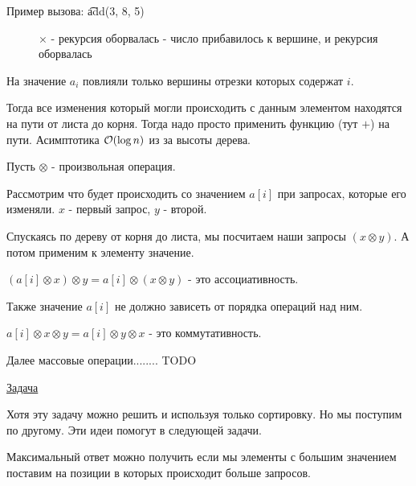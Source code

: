 Пример вызова: \t{add(3, 8, 5)}
\up \up
\begin{center}
	\begin{figure}[h]
		\captionsetup{font=small, labelformat=empty}
		\caption{$\times$ - рекурсия оборвалась \checkmark - число прибавилось к вершине, и рекурсия оборвалась}
		\label{fig:image}
	\end{figure}
\end{center}


На значение $a_i$ повлияли только вершины отрезки которых содержат $i$.

Тогда все изменения который могли происходить с данным элементом находятся на пути от листа до корня. Тогда надо просто применить функцию (тут $+$) на пути. Асимптотика $\mathcal{O}(\log n)$ из за высоты дерева.


Пусть $\otimes$ - произвольная операция.

Рассмотрим что будет происходить со значением $a[i]$ при запросах, которые его изменяли. $x$ - первый запрос, $y$ - второй.
\down

Спускаясь по дереву от корня до листа, мы посчитаем наши запросы  $(x \otimes y)$. А потом применим к элементу значение.

$(a[i] \otimes x) \otimes y = a[i] \otimes (x \otimes y)$ - это ассоциативность.

Также значение $a[i]$ не должно зависеть от порядка операций над ним.

$a[i] \otimes x \otimes y = a[i] \otimes y \otimes x$ - это коммутативность.

Далее массовые операции........ TODO

\pagebreak


\href{https://codeforces.com/contest/276/problem/C}{Задача}
\href{https://codeforces.com/contest/276/submission/106207096}{}

Хотя эту задачу можно решить и используя только сортировку. Но мы поступим по другому. Эти идеи помогут в следующей задачи.

Максимальный ответ можно получить если мы элементы с большим значением поставим на позиции в которых происходит больше запросов.

